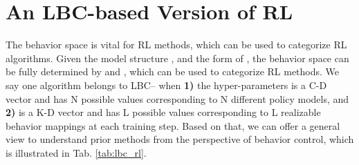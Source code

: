 \section{An LBC-based Version of RL}
\label{app: An LBC-based Version of RL}
The behavior space is vital for RL methods, which can be used to categorize RL algorithms. Given the model structure , and the form of , the behavior space can be fully determined by  and , which can be used to categorize RL methods. We say one algorithm belongs to LBC-- when \textbf{1)} the hyper-parameters  is a C-D vector and  has N possible values corresponding to N different policy models, and \textbf{2)}  is a K-D vector and  has L possible values corresponding to L realizable behavior mappings at each training step. Based on that, we can offer a general view to understand prior methods from the perspective of behavior control, which is illustrated in Tab. \ref{tab:lbc_rl}.
\begin{comment}
    虽然总空间是，但是这个空间是受限的，并不是每一个点都能全部取到。对于每个actor来说，他只能从N个model中做出选择。
\end{comment}
\begin{table*}[!htbp]
    \centering
    \caption{An LBC-based Version of RL Methods.}
    \label{tab:lbc_rl}
\end{table*}
\normalsize


